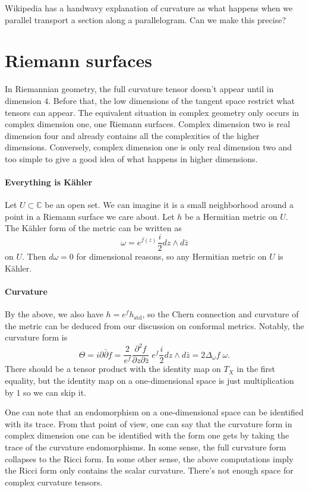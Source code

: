 \documentclass[11pt]{article}
\newcommand{\kk}[1]{\mathbb{#1}}
\begin{document}
Wikipedia has a handwavy explanation of curvature as what happens when we parallel transport a section along a parallelogram. Can we make this precise?


\section{Riemann surfaces}
\label{sec:org776713b}

In Riemannian geometry, the full curvature tensor doesn't appear until in dimension $4$. Before that, the low dimensions of the tangent space restrict what tensors can appear. The equivalent situation in complex geometry only occurs in complex dimension one, one Riemann surfaces. Complex dimension two is real dimension four and already contains all the complexities of the higher dimensions. Conversely, complex dimension one is only real dimension two and too simple to give a good idea of what happens in higher dimensions.

\paragraph{Everything is K\"ahler}
Let $U \subset \kk C$ be an open set. We can imagine it is a small neighborhood around a point in a Riemann surface we care about. Let $h$ be a Hermitian metric on $U$. The K\"ahler form of the metric can be written as
$$
\omega = e^{f(z)} \frac{i}{2} dz \wedge d\bar z
$$
on $U$. Then $d\omega = 0$ for dimensional reasons, so any Hermitian metric on $U$ is K\"ahler.

\paragraph{Curvature}
By the above, we also have $h = e^f h_{\mathrm{std}}$, so the Chern connection and curvature of the metric can be deduced from our discussion on conformal metrics. Notably, the curvature form is
$$
\Theta
= i\partial\bar\partial f
= \frac{2}{e^f}\frac{\partial^2f}{\partial z \partial \bar z} \; e^f \frac{i}{2} dz \wedge d\bar z
= 2\Delta_\omega f \; \omega.
$$
There should be a tensor product with the identity map on $T_X$ in the first equality, but the identity map on a one-dimensional space is just multiplication by $1$ so we can skip it.

One can note that an endomorphism on a one-dimensional space can be identified with its trace. From that point of view, one can say that the curvature form in complex dimension one can be identified with the form one gets by taking the trace of the curvature endomorphisms. In some sense, the full curvature form collapses to the Ricci form. In some other sense, the above computations imply the Ricci form only contains the scalar curvature. There's not enough space for complex curvature tensors.
\end{document}
